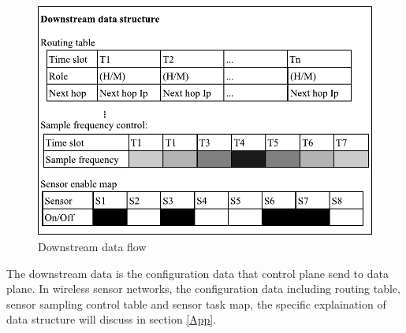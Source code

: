 \begin{figure}[htbp]
	\centering
	\includegraphics[width=.7\columnwidth]{Figure/downstream}
	\caption{Downstream data flow}
	\label{downstream}
\end{figure}

The downstream data is the configuration data that control plane send to data plane. In wireless sensor networks, 
the configuration data including routing table, sensor sampling control table and sensor task map, the specific explaination of data structure will discuss in section \ref{App}.

